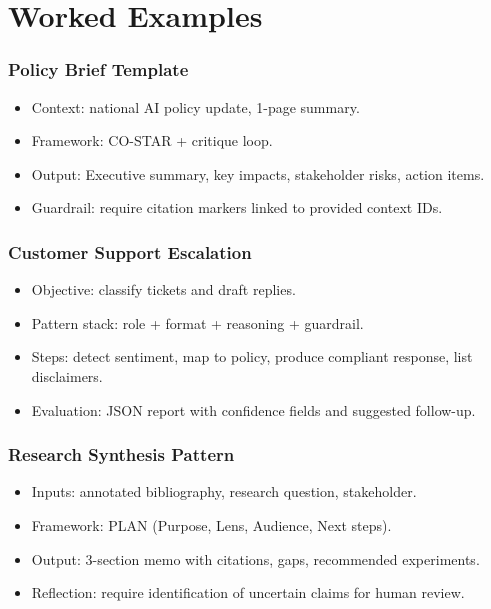 \documentclass{beamer}
\begin{document}
\section{Worked Examples}

\begin{frame}
    \frametitle{Policy Brief Template}
    \begin{itemize}
        \item Context: national AI policy update, 1-page summary.
        \item Framework: CO-STAR + critique loop.
        \item Output: Executive summary, key impacts, stakeholder risks, action items.
        \item Guardrail: require citation markers linked to provided context IDs.
    \end{itemize}
\end{frame}

\begin{frame}
    \frametitle{Customer Support Escalation}
    \begin{itemize}
        \item Objective: classify tickets and draft replies.
        \item Pattern stack: role + format + reasoning + guardrail.
        \item Steps: detect sentiment, map to policy, produce compliant response, list disclaimers.
        \item Evaluation: JSON report with confidence fields and suggested follow-up.
    \end{itemize}
\end{frame}

\begin{frame}
    \frametitle{Research Synthesis Pattern}
    \begin{itemize}
        \item Inputs: annotated bibliography, research question, stakeholder.
        \item Framework: PLAN (Purpose, Lens, Audience, Next steps).
        \item Output: 3-section memo with citations, gaps, recommended experiments.
        \item Reflection: require identification of uncertain claims for human review.
    \end{itemize}
\end{frame}

\end{document}
